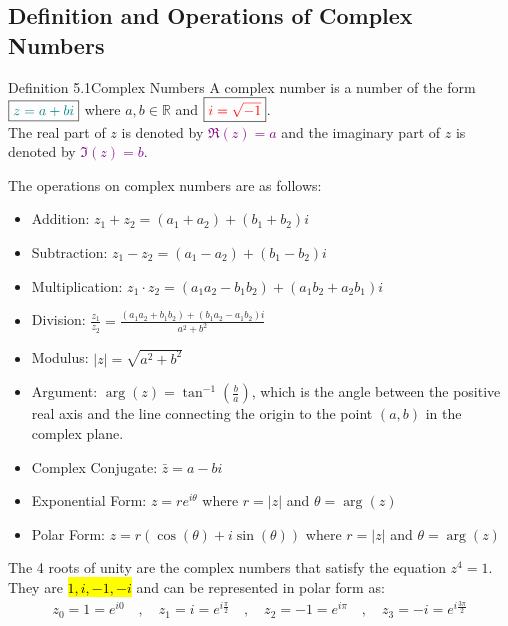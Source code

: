 \documentclass{book}
\begin{document}
\subsection{Definition and Operations of Complex Numbers}
\begin{defBox}{Definition 5.1}{Complex Numbers}
    A complex number is a number of the form $\boxed{\textcolor{teal}{z = a + bi}}$ where $a, b \in \mathbb{R}$ and $\boxed{\textcolor{red}{i = \sqrt{-1}}}$.\\
    The real part of $z$ is denoted by \textcolor{purple}{$\Re(z) = a$} and the imaginary part of $z$ is denoted by \textcolor{purple}{$\Im(z) = b$}.
\end{defBox}
The operations on complex numbers are as follows:
\begin{itemize}
    \item Addition: $z_1 + z_2 = (a_1 + a_2) + (b_1 + b_2)i$
    \item Subtraction: $z_1 - z_2 = (a_1 - a_2) + (b_1 - b_2)i$
    \item Multiplication: $z_1 \cdot z_2 = (a_1a_2 - b_1b_2) + (a_1b_2 + a_2b_1)i$
    \item Division: $\frac{z_1}{z_2} = \frac{(a_1a_2 + b_1b_2) + (b_1a_2 - a_1b_2)i}{a^2 + b^2}$
    \item Modulus: $|z| = \sqrt{a^2 + b^2}$
    \item Argument: $\arg(z) = \tan^{-1}\left(\frac{b}{a}\right)$, which is the angle between the positive real axis and the line connecting the origin to the point $(a, b)$ in the complex plane.
    \item Complex Conjugate: $\bar{z} = a - bi$
    \item Exponential Form: $z = re^{i\theta}$ where $r = |z|$ and $\theta = \arg(z)$
    \item Polar Form: $z = r(\cos(\theta) + i\sin(\theta))$ where $r = |z|$ and $\theta = \arg(z)$
\end{itemize}
\vspace{2mm}
The 4 roots of unity are the complex numbers that satisfy the equation $z^4 = 1$. They are \hl{$1, i, -1, -i$} and can be represented in polar form as:
\begin{align*}
    \boxed{z_0 = 1 = e^{i0}} \quad, \quad \boxed{z_1 = i = e^{i\frac{\pi}{2}}} \quad, \quad \boxed{z_2 = -1 = e^{i\pi}} \quad, \quad \boxed{z_3 = -i = e^{i\frac{3\pi}{2}}}
\end{align*}
\end{document}
